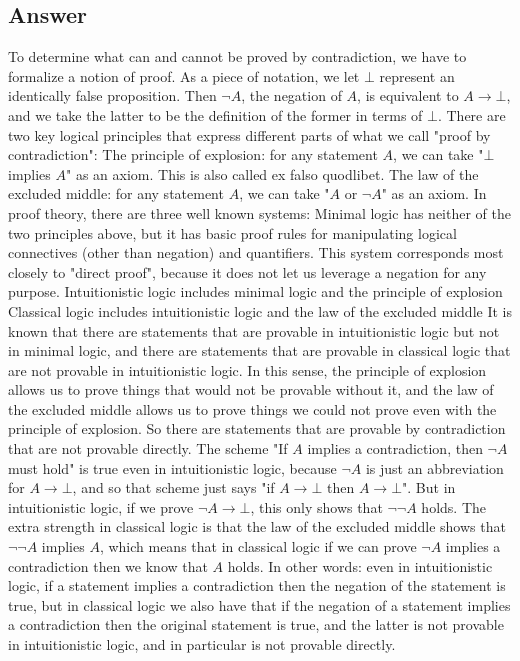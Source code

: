 \documentclass{article}
\begin{document}
\subsection*{Answer}
To determine what can and cannot be proved by contradiction, we have to formalize a notion of proof. As a piece of notation, we let $\bot$ represent an identically false proposition. Then $\lnot A$, the negation of $A$, is equivalent to $A \to \bot$, and we take the latter to be the definition of the former in terms of $\bot$. There are two key logical principles that express different parts of what we call "proof by contradiction": The principle of explosion: for any statement $A$, we can take "$\bot$ implies $A$" as an axiom. This is also called ex falso quodlibet. The law of the excluded middle: for any statement $A$, we can take "$A$ or $\lnot A$" as an axiom. In proof theory, there are three well known systems: Minimal logic has neither of the two principles above, but it has basic proof rules for manipulating logical connectives (other than negation) and quantifiers. This system corresponds most closely to "direct proof", because it does not let us leverage a negation for any purpose. Intuitionistic logic includes minimal logic and the principle of explosion Classical logic includes intuitionistic logic and the law of the excluded middle It is known that there are statements that are provable in intuitionistic logic but not in minimal logic, and there are statements that are provable in classical logic that are not provable in intuitionistic logic. In this sense, the principle of explosion allows us to prove things that would not be provable without it, and the law of the excluded middle allows us to prove things we could not prove even with the principle of explosion. So there are statements that are provable by contradiction that are not provable directly. The scheme "If $A$ implies a contradiction, then $\lnot A$ must hold" is true even in intuitionistic logic, because $\lnot A$ is just an abbreviation for $A \to \bot$, and so that scheme just says "if $A \to \bot$ then $A \to \bot$". But in intuitionistic logic, if we prove $\lnot A \to \bot$, this only shows that $\lnot \lnot A$ holds. The extra strength in classical logic is that the law of the excluded middle shows that $\lnot \lnot A$ implies $A$, which means that in classical logic if we can prove $\lnot A$ implies a contradiction then we know that $A$ holds. In other words: even in intuitionistic logic, if a statement implies a contradiction then the negation of the statement is true, but in classical logic we also have that if the negation of a statement implies a contradiction then the original statement is true, and the latter is not provable in intuitionistic logic, and in particular is not provable directly.
\end{document}
